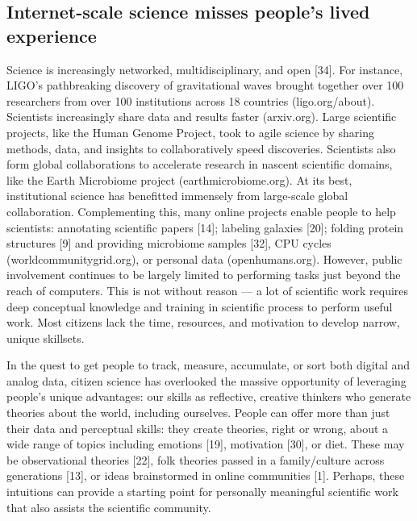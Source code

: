 \subsection{Internet-scale science misses people’s lived experience}
Science is increasingly networked, multidisciplinary, and
open [34]. For instance, LIGO’s pathbreaking discovery of
gravitational waves brought together over 100 researchers
from over 100 institutions across 18 countries
(ligo.org/about). Scientists increasingly share data and results
faster (arxiv.org). Large scientific projects, like the Human
Genome Project, took to agile science by sharing
methods, data, and insights to collaboratively speed discoveries.
Scientists also form global collaborations to accelerate
research in nascent scientific domains, like the Earth Microbiome
project (earthmicrobiome.org).
At its best, institutional science has benefitted immensely
from large-scale global collaboration. Complementing this,
many online projects enable people to help scientists: annotating
scientific papers [14]; labeling galaxies [20]; folding
protein structures [9] and providing microbiome samples
[32], CPU cycles (worldcommunitygrid.org), or personal data
(openhumans.org). However, public involvement continues
to be largely limited to performing tasks just beyond the
reach of computers. This is not without reason — a lot of scientific
work requires deep conceptual knowledge and training
in scientific process to perform useful work. Most
citizens lack the time, resources, and motivation to develop
narrow, unique skillsets.

In the quest to get people to track, measure, accumulate, or
sort both digital and analog data, citizen science has overlooked
the massive opportunity of leveraging people’s
unique advantages: our skills as reflective, creative thinkers
who generate theories about the world, including ourselves.
People can offer more than just their data and perceptual
skills: they create theories, right or wrong, about a wide
range of topics including emotions [19], motivation [30], or
diet. These may be observational theories [22], folk theories
passed in a family/culture across generations [13], or ideas
brainstormed in online communities [1]. Perhaps, these intuitions
can provide a starting point for personally meaningful scientific work that also assists the scientific community.

